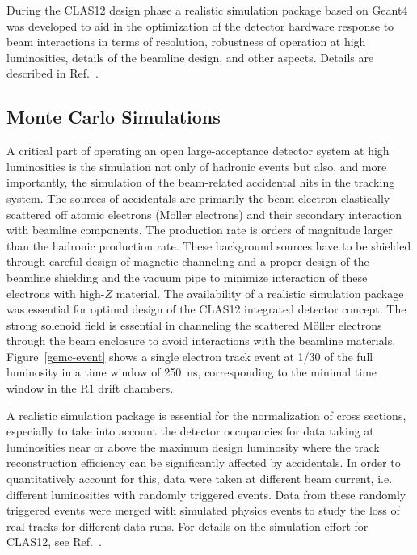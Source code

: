 \documentclass[final,3p,twocolumn]{elsarticle}
\begin{document}
During the CLAS12 design phase a realistic simulation package based on Geant4 was developed to aid in the optimization 
of the detector hardware response to beam interactions in terms of resolution, robustness of operation at high
luminosities, details of the beamline design, and other aspects.   Details are described in Ref.~\cite{Software}. 

\subsection{Monte Carlo Simulations} 

A critical part of operating an open large-acceptance detector system at high luminosities is the simulation not only of
hadronic events but also, and more importantly, the simulation of the beam-related accidental hits in the tracking system.
The sources of accidentals are primarily the beam electron elastically scattered off atomic electrons (M{\"o}ller electrons)
and their secondary interaction with beamline components. The production rate is orders of magnitude larger than the
hadronic production rate. These background sources have to be shielded through careful design of magnetic channeling and
a proper design of the beamline shielding and the vacuum pipe to minimize interaction of these electrons with high-$Z$
material. The availability of a realistic simulation package was essential for optimal design of the CLAS12 integrated detector
concept. The strong solenoid field is essential in channeling the scattered M{\"o}ller electrons through the beam enclosure
to avoid interactions with the beamline materials. Figure~\ref{gemc-event}  shows a single electron track event at 1/30 of
the full luminosity in a time window of 250~ns, corresponding to the minimal time window in the R1 drift chambers. 
 
 A realistic simulation package is essential for the normalization of cross sections, especially to take into account the 
 detector occupancies for data taking at luminosities near or above the maximum design luminosity where the track 
 reconstruction efficiency can be significantly affected by accidentals. In order to quantitatively account for this, data
 were taken at different beam current, i.e. different luminosities with randomly triggered events. Data from these 
 randomly triggered events were merged with simulated physics events to study the loss of real tracks for different 
 data runs. For details on the simulation effort for CLAS12, see Ref.~\cite{GEMC}.    
\end{document}
